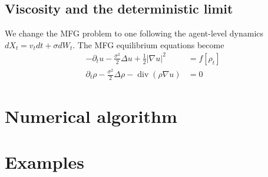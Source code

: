 \documentclass{article}
\DeclareMathOperator{\divg}{div}
\numberwithin{equation}{section}
\theoremstyle{definition}
\begin{document}
\subsection{Viscosity and the deterministic limit}

We change the MFG problem to one following the agent-level dynamics $dX_t = v_t dt + \sigma dW_t$. The MFG equilibrium equations become
\begin{equation}
\begin{aligned}
	-\partial_t u - \frac{\sigma^2}{2}\Delta u + \frac12 |\nabla u|^2 &= f[\rho_t] \\
	\partial_t \rho - \frac{\sigma^2}{2}\Delta\rho - \divg(\rho\nabla u) &= 0
\end{aligned}	
\end{equation}


\section{Numerical algorithm}





\section{Examples}






\printbibliography{}
\end{document}
